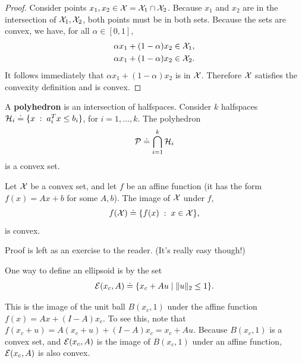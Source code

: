 \documentclass[12pt]{article}
\begin{document}
\begin{proof}
Consider points $x_1, x_2 \in {\mathcal X} = {\mathcal X}_1 \cap {\mathcal X}_2$. Because $x_1$ and $x_2$ are in the intersection of ${\mathcal X}_1, {\mathcal X}_2$, both points must be in both sets. Because the sets are convex, we have, for all $\alpha \in [0,1]$,
%
\begin{align*}
& \alpha x_1 + (1-\alpha) x_2 \in {\mathcal X}_1, \\
& \alpha x_1 + (1-\alpha) x_2 \in {\mathcal X}_2.
\end{align*}
%
It follows immediately that $\alpha x_1 + (1-\alpha) x_2$ is in ${\mathcal X}$. Therefore ${\mathcal X}$ satisfies the convexity definition and is convex.
\end{proof}

\begin{example}[Polyhedron]
A \textbf{polyhedron} is an intersection of halfspaces. Consider $k$ halfspaces ${\mathcal H}_i \doteq \{x \; : \; a_i^T x \leq b_i\}$, for $i=1, ..., k$. The polyhedron 
%
\begin{equation*}
{\mathcal P} \doteq \bigcap_{i=1}^k {\mathcal H}_i
\end{equation*}
%
is a convex set.

\end{example}


\begin{proposition} Let ${\mathcal X}$ be a convex set, and let $f$ be an affine function (it has the form $f(x) = Ax + b$ for some $A,b$).  The image of ${\mathcal X}$ under $f$, 
%
\begin{equation*}
f({\mathcal X}) \doteq \{f(x) \; : \; x \in {\mathcal X}\},
\end{equation*}
%
is convex.
\end{proposition}

Proof is left as an exercise to the reader. (It's really easy though!)

\begin{example}[Ellipsoid]
One way to define an ellipsoid is by the set
%
\begin{equation*}
{\mathcal E}(x_c, A) \doteq \{x_c + Au \; | \; \|u\|_2 \leq 1\}.
\end{equation*}

This is the image of the unit ball $B(x_c,1)$  under the affine function $f(x) = Ax + (I - A)x_c$. To see this, note that $f(x_c + u) = A(x_c + u) + (I-A) x_c = x_c + Au$. Because $B(x_c,1)$ is a convex set, and ${\mathcal E}(x_c, A)$ is the image of $B(x_c,1)$ under an affine function, ${\mathcal E}(x_c, A)$ is also convex.

\end{example}
\end{document}
